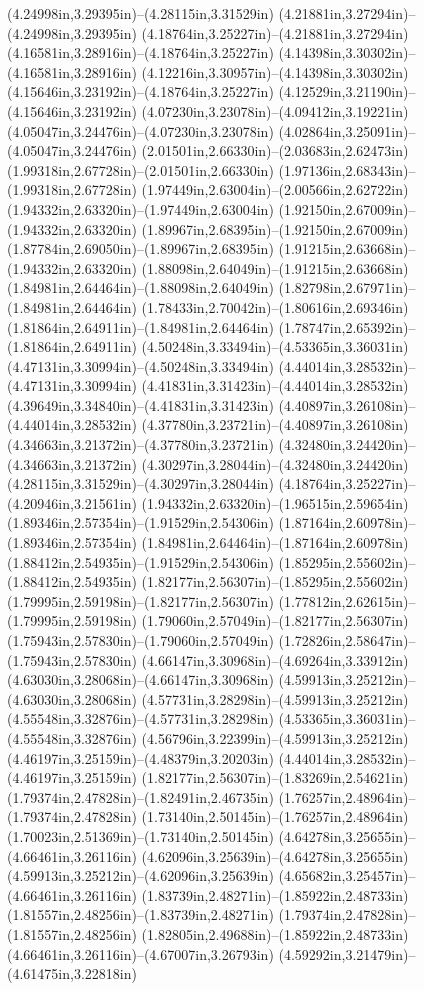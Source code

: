 (4.24998in,3.29395in)--(4.28115in,3.31529in) (4.21881in,3.27294in)--(4.24998in,3.29395in) (4.18764in,3.25227in)--(4.21881in,3.27294in) (4.16581in,3.28916in)--(4.18764in,3.25227in) (4.14398in,3.30302in)--(4.16581in,3.28916in) (4.12216in,3.30957in)--(4.14398in,3.30302in) (4.15646in,3.23192in)--(4.18764in,3.25227in) (4.12529in,3.21190in)--(4.15646in,3.23192in) (4.07230in,3.23078in)--(4.09412in,3.19221in) (4.05047in,3.24476in)--(4.07230in,3.23078in) (4.02864in,3.25091in)--(4.05047in,3.24476in) (2.01501in,2.66330in)--(2.03683in,2.62473in) (1.99318in,2.67728in)--(2.01501in,2.66330in) (1.97136in,2.68343in)--(1.99318in,2.67728in) (1.97449in,2.63004in)--(2.00566in,2.62722in) (1.94332in,2.63320in)--(1.97449in,2.63004in) (1.92150in,2.67009in)--(1.94332in,2.63320in) (1.89967in,2.68395in)--(1.92150in,2.67009in) (1.87784in,2.69050in)--(1.89967in,2.68395in) (1.91215in,2.63668in)--(1.94332in,2.63320in) (1.88098in,2.64049in)--(1.91215in,2.63668in) (1.84981in,2.64464in)--(1.88098in,2.64049in) (1.82798in,2.67971in)--(1.84981in,2.64464in) (1.78433in,2.70042in)--(1.80616in,2.69346in) (1.81864in,2.64911in)--(1.84981in,2.64464in) (1.78747in,2.65392in)--(1.81864in,2.64911in) (4.50248in,3.33494in)--(4.53365in,3.36031in) (4.47131in,3.30994in)--(4.50248in,3.33494in) (4.44014in,3.28532in)--(4.47131in,3.30994in) (4.41831in,3.31423in)--(4.44014in,3.28532in) (4.39649in,3.34840in)--(4.41831in,3.31423in) (4.40897in,3.26108in)--(4.44014in,3.28532in) (4.37780in,3.23721in)--(4.40897in,3.26108in) (4.34663in,3.21372in)--(4.37780in,3.23721in) (4.32480in,3.24420in)--(4.34663in,3.21372in) (4.30297in,3.28044in)--(4.32480in,3.24420in) (4.28115in,3.31529in)--(4.30297in,3.28044in) (4.18764in,3.25227in)--(4.20946in,3.21561in) (1.94332in,2.63320in)--(1.96515in,2.59654in) (1.89346in,2.57354in)--(1.91529in,2.54306in) (1.87164in,2.60978in)--(1.89346in,2.57354in) (1.84981in,2.64464in)--(1.87164in,2.60978in) (1.88412in,2.54935in)--(1.91529in,2.54306in) (1.85295in,2.55602in)--(1.88412in,2.54935in) (1.82177in,2.56307in)--(1.85295in,2.55602in) (1.79995in,2.59198in)--(1.82177in,2.56307in) (1.77812in,2.62615in)--(1.79995in,2.59198in) (1.79060in,2.57049in)--(1.82177in,2.56307in) (1.75943in,2.57830in)--(1.79060in,2.57049in) (1.72826in,2.58647in)--(1.75943in,2.57830in) (4.66147in,3.30968in)--(4.69264in,3.33912in) (4.63030in,3.28068in)--(4.66147in,3.30968in) (4.59913in,3.25212in)--(4.63030in,3.28068in) (4.57731in,3.28298in)--(4.59913in,3.25212in) (4.55548in,3.32876in)--(4.57731in,3.28298in) (4.53365in,3.36031in)--(4.55548in,3.32876in) (4.56796in,3.22399in)--(4.59913in,3.25212in) (4.46197in,3.25159in)--(4.48379in,3.20203in) (4.44014in,3.28532in)--(4.46197in,3.25159in) (1.82177in,2.56307in)--(1.83269in,2.54621in) (1.79374in,2.47828in)--(1.82491in,2.46735in) (1.76257in,2.48964in)--(1.79374in,2.47828in) (1.73140in,2.50145in)--(1.76257in,2.48964in) (1.70023in,2.51369in)--(1.73140in,2.50145in) (4.64278in,3.25655in)--(4.66461in,3.26116in) (4.62096in,3.25639in)--(4.64278in,3.25655in) (4.59913in,3.25212in)--(4.62096in,3.25639in) (4.65682in,3.25457in)--(4.66461in,3.26116in) (1.83739in,2.48271in)--(1.85922in,2.48733in) (1.81557in,2.48256in)--(1.83739in,2.48271in) (1.79374in,2.47828in)--(1.81557in,2.48256in) (1.82805in,2.49688in)--(1.85922in,2.48733in) (4.66461in,3.26116in)--(4.67007in,3.26793in) (4.59292in,3.21479in)--(4.61475in,3.22818in) 